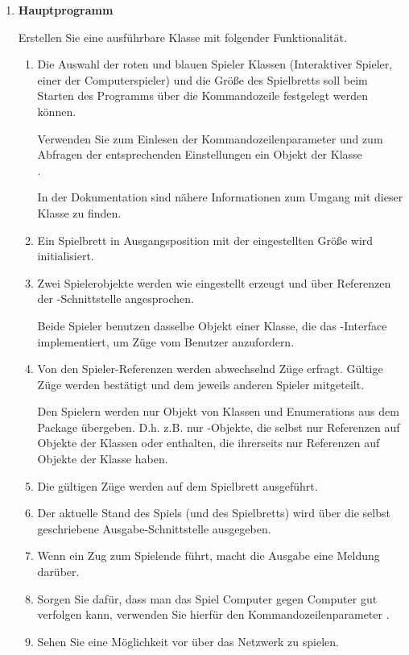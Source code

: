 \begin{enumerate}
\begin{enumerate}

\end{enumerate}

\pagebreak
\item \textbf{Hauptprogramm}
\label{impl:main}

Erstellen Sie eine ausführbare Klasse mit folgender Funktionalität.

\begin{enumerate}
\item Die Auswahl der roten und blauen Spieler Klassen (Interaktiver Spieler, einer der Computerspieler) und die Größe des Spielbretts soll beim Starten des Programms über die Kommandozeile festgelegt werden können.

Verwenden Sie zum Einlesen der Kommandozeilenparameter und zum Abfragen der entsprechenden Einstellungen ein Objekt der Klasse \\
.

In der Dokumentation sind nähere Informationen zum Umgang mit dieser Klasse zu finden.

\item Ein Spielbrett in Ausgangsposition mit der eingestellten Größe wird initialisiert.
\item Zwei Spielerobjekte werden wie eingestellt erzeugt und über Referenzen der -Schnittstelle angesprochen. 

Beide Spieler benutzen dasselbe Objekt einer Klasse, die das -Interface implementiert, um Züge vom Benutzer anzufordern.
\item Von den Spieler-Referenzen werden abwechselnd Züge erfragt. Gültige Züge werden bestätigt und dem jeweils anderen Spieler mitgeteilt.
  
Den Spielern werden nur Objekt von Klassen und Enumerations aus dem Package  übergeben.
D.h. z.B. nur -Objekte, die selbst nur Referenzen auf Objekte
der Klassen  oder  enthalten, die ihrerseits nur 
Referenzen auf Objekte der Klasse  haben.  
\item Die gültigen Züge werden auf dem Spielbrett ausgeführt.
\item Der aktuelle Stand des Spiels (und des Spielbretts) wird über die selbst geschriebene Ausgabe-Schnittstelle ausgegeben.
\item Wenn ein Zug zum Spielende führt, macht die Ausgabe eine Meldung darüber.
\item Sorgen Sie dafür, dass man das Spiel Computer gegen Computer gut verfolgen kann, verwenden Sie hierfür den Kommandozeilenparameter .
\item Sehen Sie eine Möglichkeit vor über das Netzwerk zu spielen. 


\end{enumerate}
\end{enumerate}
